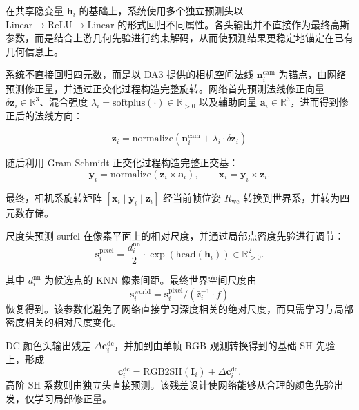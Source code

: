 在共享隐变量 $\mathbf{h}_i$ 的基础上，系统使用多个独立预测头以 $\text{Linear} \to \text{ReLU} \to \text{Linear}$ 的形式回归不同属性。各头输出并不直接作为最终高斯参数，而是结合上游几何先验进行约束解码，从而使预测结果更稳定地锚定在已有几何信息上。

系统不直接回归四元数，而是以 DA3 提供的相机空间法线 $\mathbf{n}_i^{\text{cam}}$ 为锚点，由网络预测修正量，并通过正交化过程构造完整旋转。网络首先预测法线修正向量 $\delta \mathbf{z}_i \in \mathbb{R}^3$、混合强度 $\lambda_i = \text{softplus}(\cdot) \in \mathbb{R}_{>0}$ 以及辅助向量 $\mathbf{a}_i \in \mathbb{R}^3$，进而得到修正后的法线方向：

\begin{equation}
\mathbf{z}_i = \text{normalize}(\mathbf{n}_i^{\text{cam}} + \lambda_i \cdot \delta \mathbf{z}_i)
\end{equation}

随后利用 Gram-Schmidt 正交化过程构造完整正交基：
\begin{equation}
\mathbf{y}_i = \text{normalize}(\mathbf{z}_i \times \mathbf{a}_i), \qquad \mathbf{x}_i = \mathbf{y}_i \times \mathbf{z}_i.
\end{equation}

最终，相机系旋转矩阵 $[\mathbf{x}_i \mid \mathbf{y}_i \mid \mathbf{z}_i]$ 经当前帧位姿 $R_{\text{wc}}$ 转换到世界系，并转为四元数存储。

尺度头预测 surfel 在像素平面上的相对尺度，并通过局部点密度先验进行调节：
\begin{equation}
\mathbf{s}_i^{\text{pixel}} = \frac{d_i^{\text{nn}}}{2} \cdot \exp(\text{head}(\mathbf{h}_i)) \in \mathbb{R}^2_{>0}.
\end{equation}

其中 $d_i^{\text{nn}}$ 为候选点的 KNN 像素间距。最终世界空间尺度由
\begin{equation}
\mathbf{s}_i^{\text{world}} = \mathbf{s}_i^{\text{pixel}} / (\bar{z}_i^{-1} \cdot f)
\end{equation}
恢复得到。该参数化避免了网络直接学习深度相关的绝对尺度，而只需学习与局部密度相关的相对尺度变化。

DC 颜色头输出残差 $\Delta \mathbf{c}_i^{\text{dc}}$，并加到由单帧 RGB 观测转换得到的基础 SH 先验上，形成
\begin{equation}
\mathbf{c}_i^{\text{dc}} = \text{RGB2SH}(\mathbf{I}_i) + \Delta \mathbf{c}_i^{\text{dc}}.
\end{equation}
高阶 SH 系数则由独立头直接预测。该残差设计使网络能够从合理的颜色先验出发，仅学习局部修正量。

